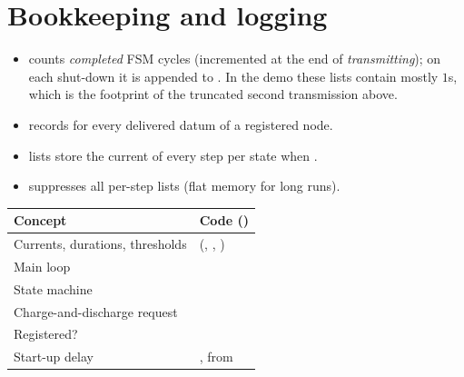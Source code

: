 \section{Bookkeeping and logging}

\begin{itemize}
 \item {} counts \emph{completed} FSM cycles (incremented at the end of \emph{transmitting}); on each shut-down it is appended to . In the demo these lists contain mostly $1$s, which is the footprint of the truncated second transmission above.
 \item {} records  for every delivered datum of a registered node.
 \item {} lists store the current of every step per state when .
 \item {} suppresses all per-step lists (flat memory for long runs).
\end{itemize}

\begin{codemap}
\small
\begin{tabularx}{\linewidth}{@{}>{\ttfamily}p{5.0cm}X@{}}
\toprule
\normalfont\bfseries Concept & \normalfont\bfseries Code (\file{controller.py})\\
\midrule
Currents, durations, thresholds & \codew{ControllerParams} (\code{CurrentsA}, \code{DurationsMs}, \codew{VoltageThresholdsV})\\
Main loop & \codew{Controller.run}\\
State machine & \codew{Controller.working_mode}\\
Charge-and-discharge request & \codew{Controller._enter_charge_and_discharge}\\
Registered? & \codew{Controller._is_registered}\\
Start-up delay & \codew{startup_delay_s}, from \codew{max_startup_time_ms}\\
\bottomrule
\end{tabularx}
\end{codemap}

